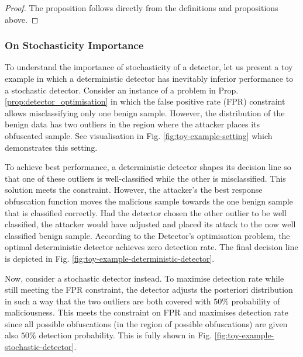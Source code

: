 \begin{proof}
 The proposition follows directly from the definitions and propositions above.
\end{proof}

\subsubsection{On Stochasticity Importance}\label{sec:stochasticity_importance}
To understand the importance of stochasticity of a detector, let us present a toy example in which a deterministic detector has inevitably inferior performance to a stochastic detector. Consider an instance of a problem in Prop. \ref{prop:detector_optimisation} in which the false positive rate (FPR) constraint allows misclassifying only one benign sample. However, the distribution of the benign data has two outliers in the region where the attacker places its obfuscated sample. See visualisation in Fig. \ref{fig:toy-example-setting} which demonstrates this setting.

To achieve best performance, a deterministic detector shapes its decision line so that one of these outliers is well-classified while the other is misclassified. This solution meets the constraint. However, the attacker's the best response obfuscation function moves the malicious sample towards the one benign sample that is classified correctly. Had the detector chosen the other outlier to be well classified, the attacker would have adjusted and placed its attack to the now well classified benign sample. According to the Detector's optimisation problem, the optimal deterministic detector achieves zero detection rate. The final decision line is depicted in Fig. \ref{fig:toy-example-deterministic-detector}.

Now, consider a stochastic detector instead. To maximise detection rate while still meeting the FPR constraint, the detector adjusts the posteriori distribution in such a way that the two outliers are both covered with $50 \%$ probability of maliciousness. This meets the constraint on FPR and maximises detection rate since all possible obfuscations (in the region of possible obfuscations) are given also $50\%$ detection probability. This is fully shown in Fig. \ref{fig:toy-example-stochastic-detector}.

